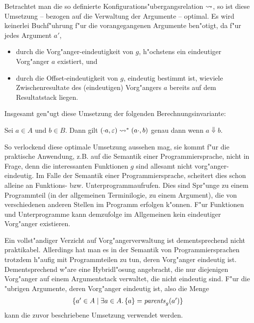 \documentclass[12pt,a4paper]{article}
\begin{document}
Betrachtet man die so definierte Konfigurations"ubergangsrelation $\rightsquigarrow$, so ist diese Umsetzung
-- bezogen auf die Verwaltung der Argumente -- optimal. Es wird keinerlei Buchf"uhrung f"ur die
vorangegangenen Argumente ben"otigt, da f"ur jedes Argument $a'$,
\begin{itemize}
\item durch die Vorg"anger-eindeutigkeit von $g$, h"ochstens ein eindeutiger Vorg"anger $a$ existiert, und
\item durch die Offset-eindeutigkeit von $g$, eindeutig bestimmt ist, wieviele Zwischenresultate des
  (eindeutigen) Vorg"angers $a$ bereits auf dem Resultatstack liegen.
\end{itemize}
Insgesamt gen"ugt diese Umsetzung der folgenden Berechnungsinvariante:
\begin{lemma}
  Sei $a \in A$ und $b \in B$. Dann gilt
  $(\cdot a,\varepsilon) \rightsquigarrow^* (a \cdot, b)$
  genau dann wenn $a \Downarrow b$.
\end{lemma}

So verlockend diese optimale Umsetzung aussehen mag, sie kommt f"ur die praktische Anwendung, z.B. auf die
Semantik einer Programmiersprache, nicht in Frage, denn die interessanten Funktionen $g$ sind allesamt
nicht vorg"anger-eindeutig. Im Falle der Semantik einer Programmiersprache, scheitert dies schon alleine
an Funktions- bzw. Unterprogrammaufrufen. Dies sind Spr"unge zu einem Programmteil (in der allgemeinen
Terminilogie, zu einem Argument), die von verschiedenen anderen Stellen im Programm erfolgen k"onnen.
F"ur Funktionen und Unterprogramme kann demzufolge im Allgemeinen kein eindeutiger Vorg"anger existieren.

Ein vollst"andiger Verzicht auf Vorg"angerverwaltung ist dementsprechend nicht praktikabel. Allerdings
hat man es in der Semantik von Programmiersprachen trotzdem h"aufig mit Programmteilen zu tun, deren
Vorg"anger eindeutig ist. Dementsprechend w"are eine Hybridl"osung angebracht, die nur diejenigen
Vorg"anger auf einem Argumentstack verwaltet, die nicht eindeutig sind. F"ur die "ubrigen Argumente,
deren Vorg"anger eindeutig ist, also die Menge
\[\begin{array}{c}
  \{a' \in A \mid \exists a \in A.\,\{a\} = \mathit{parents}_g(a')\}
\end{array}\]
kann die zuvor beschriebene Umsetzung verwendet werden.
\end{document}
